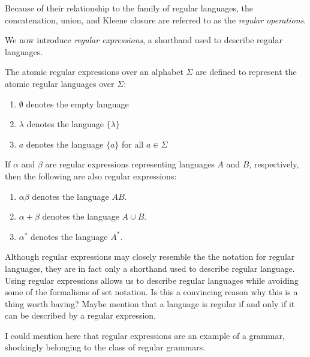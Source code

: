 \documentclass{bcthesis}
\renewcommand{\meo}{}
\newcommand{\footcite}[2]{\footnote{\cite[pg.~{#2}]{#1}}}
\renewcommand{\footcite}[2]{\cite[pg.~{#2}]{#1}}
\begin{document}
	\begin{remark}
		Because of their relationship to the family of regular languages, the concatenation, union, and Kleene closure are referred to as the \textit{regular operations}.\footcite{salomaa}{26}
	\end{remark}

	We now introduce \textit{regular expressions}, a shorthand used to describe regular languages.

	\begin{definition}
		The atomic regular expressions over an alphabet $\Sigma$ are defined to represent the atomic regular languages over $\Sigma$:
		\begin{enumerate}[label=(\roman*), itemsep = -0.3 ex, nolistsep]
			\item $\emptyset$ denotes the empty language
			\item $\lambda$ denotes the language $\{ \lambda \}$
			\item $a$ denotes the language $\{ a \}$ for all $a \in \Sigma$
		\end{enumerate}
		\footcite{hopcroft}{28--29}

		If $\alpha$ and $\beta$ are regular expressions representing languages $A$ and $B$, respectively, then the following are also regular expressions:
		\begin{enumerate}[label=(\roman*), itemsep = -0.3 ex, nolistsep]
			\item $\alpha \beta$ denotes the language $AB$.
			\item $\alpha + \beta$ denotes the language $A \cup B$.
			\item $\alpha^*$ denotes the language $A^*$.
		\end{enumerate}
		\footcite{hopcroft}{28--29}
	\end{definition}

	\begin{remark}
		Although regular expressions may closely resemble the the notation for regular languages, they are in fact only a shorthand used to describe regular language. 
		Using regular expressions allows us to describe regular languages while avoiding some of the formalisms of set notation.
		\meo{
			Is this a convincing reason why this is a thing worth having?
			Maybe mention that a language is regular if and only if it can be described by a regular expression.
		}

	\end{remark}

	\meo{
		I could mention here that regular expressions are an example of a grammar, shockingly belonging to the class of regular grammars.
	}
\end{document}
